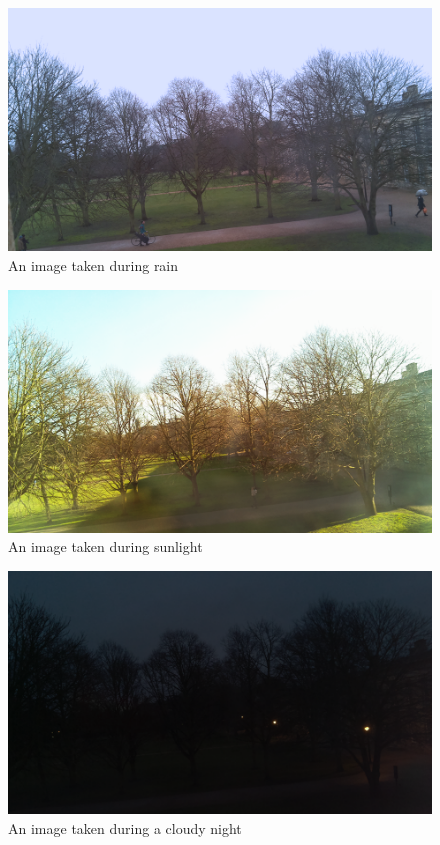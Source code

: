 \documentclass[a4paper,12pt,twoside]{report}
\begin{document}
\newpage %

\begin{figure}[H]
 \centering
 \includegraphics[scale=0.45]{imp-rain.png}
 \caption{An image taken during rain} 
 \label{fig:rain}
\end{figure}

\begin{figure}[H]
 \centering
 \includegraphics[scale=0.45]{imp-sun.png}
 \caption{An image taken during sunlight} 
\end{figure}

\begin{figure}[H]
 \centering
 \includegraphics[scale=0.45]{imp-night.png}
 \caption{An image taken during a cloudy night} 
\end{figure}
\end{document}
